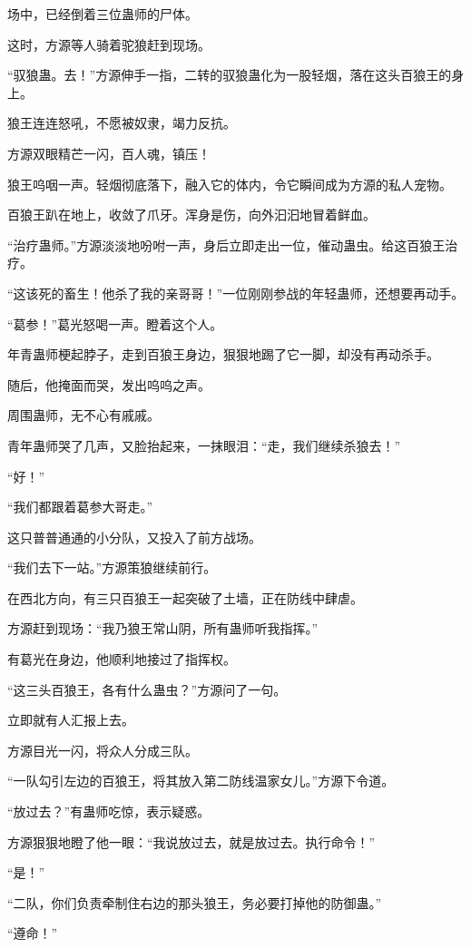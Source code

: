\begin{this_body}
场中，已经倒着三位蛊师的尸体。

这时，方源等人骑着驼狼赶到现场。

“驭狼蛊。去！”方源伸手一指，二转的驭狼蛊化为一股轻烟，落在这头百狼王的身上。

狼王连连怒吼，不愿被奴隶，竭力反抗。

方源双眼精芒一闪，百人魂，镇压！

狼王呜咽一声。轻烟彻底落下，融入它的体内，令它瞬间成为方源的私人宠物。

百狼王趴在地上，收敛了爪牙。浑身是伤，向外汩汩地冒着鲜血。

“治疗蛊师。”方源淡淡地吩咐一声，身后立即走出一位，催动蛊虫。给这百狼王治疗。

“这该死的畜生！他杀了我的亲哥哥！”一位刚刚参战的年轻蛊师，还想要再动手。

“葛参！”葛光怒喝一声。瞪着这个人。

年青蛊师梗起脖子，走到百狼王身边，狠狠地踢了它一脚，却没有再动杀手。

随后，他掩面而哭，发出呜呜之声。

周围蛊师，无不心有戚戚。

青年蛊师哭了几声，又脸抬起来，一抹眼泪：“走，我们继续杀狼去！”

“好！”

“我们都跟着葛参大哥走。”

这只普普通通的小分队，又投入了前方战场。

“我们去下一站。”方源策狼继续前行。

在西北方向，有三只百狼王一起突破了土墙，正在防线中肆虐。

方源赶到现场：“我乃狼王常山阴，所有蛊师听我指挥。”

有葛光在身边，他顺利地接过了指挥权。

“这三头百狼王，各有什么蛊虫？”方源问了一句。

立即就有人汇报上去。

方源目光一闪，将众人分成三队。

“一队勾引左边的百狼王，将其放入第二防线温家女儿。”方源下令道。

“放过去？”有蛊师吃惊，表示疑惑。

方源狠狠地瞪了他一眼：“我说放过去，就是放过去。执行命令！”

“是！”

“二队，你们负责牵制住右边的那头狼王，务必要打掉他的防御蛊。”

“遵命！”


\end{this_body}
